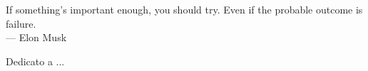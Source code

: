 
\cleardoublepage
{}
\thispagestyle{empty}

\vspace*{3cm}

\begin{center}
If something's important enough, you should try. Even if the probable outcome is failure.\\ \medskip
--- Elon Musk  
\end{center}

\medskip

\begin{center}
Dedicato a ...
\end{center}
